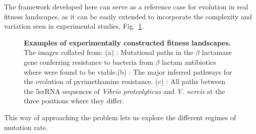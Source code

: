 \documentclass[oneside,11pt,a4paper]{book}
\begin{document}
The framework developed here can serve as a reference case for evolution in real fitness landscapes, 
as it can be easily extended to incorporate the complexity and variation seen in experimental studies, Fig.\ \ref{fig:expfitland}.
%
\begin{figure}[h]
  \begin{center}
    \caption{\textbf{Examples of experimentally constructed fitness landscapes.}
\small{The images collated from:
    (a) \citet{weinreich:2006aa}: Mutational paths in the $\beta$ lactamase gene conferring resistance to bacteria from $\beta$ lactam antibiotics where were found to be viable.(b) \citet{lozovsky:2009aa}: The major inferred pathways for the evolution of pyrimethamine resistance. (c) \citet{lee:1997}: All paths between the 5srRNA sequences of \textit{Vibrio proteolyticus} and \textit{V. nereis} at the three positions where they differ.}
    }
    \label{fig:expfitland}
  \end{center}
\end{figure}
%
This way of approaching the problem lets us explore the different regimes of mutation rate.
%
\end{document}

